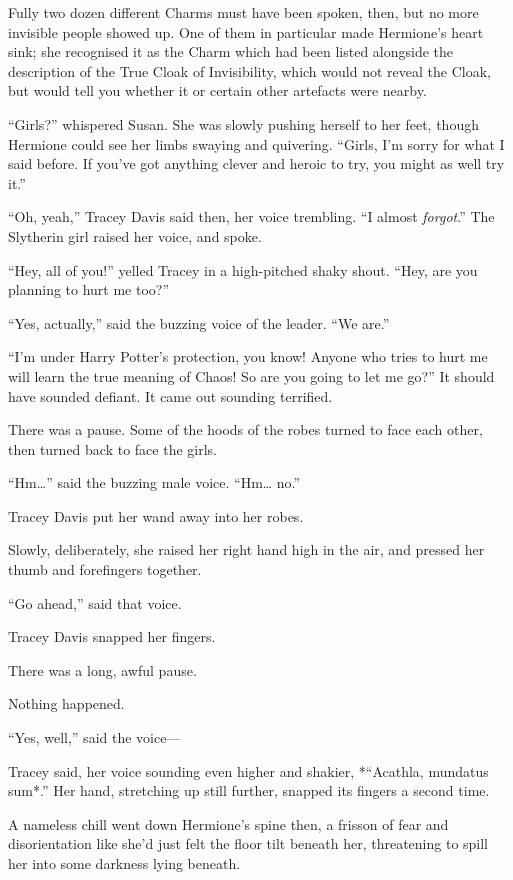 Fully two dozen different Charms must have been spoken, then, but no
more invisible people showed up. One of them in particular made
Hermione's heart sink; she recognised it as the Charm which had been
listed alongside the description of the True Cloak of Invisibility,
which would not reveal the Cloak, but would tell you whether it or
certain other artefacts were nearby.

``Girls?'' whispered Susan. She was slowly pushing herself to her feet,
though Hermione could see her limbs swaying and quivering. ``Girls, I'm
sorry for what I said before. If you've got anything clever and heroic
to try, you might as well try it.''

``Oh, yeah,'' Tracey Davis said then, her voice trembling. ``I almost
\emph{forgot}.'' The Slytherin girl raised her voice, and spoke.

``Hey, all of you!'' yelled Tracey in a high-pitched shaky shout. ``Hey,
are you planning to hurt me too?''

``Yes, actually,'' said the buzzing voice of the leader. ``We are.''

``I'm under Harry Potter's protection, you know! Anyone who tries to
hurt me will learn the true meaning of Chaos! So are you going to let me
go?'' It should have sounded defiant. It came out sounding terrified.

There was a pause. Some of the hoods of the robes turned to face each
other, then turned back to face the girls.

``Hm\ldots{}'' said the buzzing male voice. ``Hm\ldots{} no.''

Tracey Davis put her wand away into her robes.

Slowly, deliberately, she raised her right hand high in the air, and
pressed her thumb and forefingers together.

``Go ahead,'' said that voice.

Tracey Davis snapped her fingers.

There was a long, awful pause.

Nothing happened.

``Yes, well,'' said the voice---

Tracey said, her voice sounding even higher and shakier, *``Acathla,
mundatus sum*.'' Her hand, stretching up still further, snapped its
fingers a second time.

A nameless chill went down Hermione's spine then, a frisson of fear and
disorientation like she'd just felt the floor tilt beneath her,
threatening to spill her into some darkness lying beneath.

